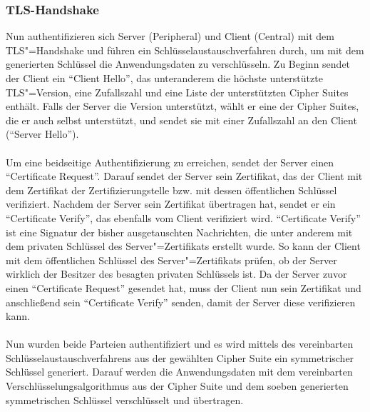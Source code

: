 \subsubsection{TLS-Handshake}
Nun authentifizieren sich Server (Peripheral) und Client (Central) mit dem TLS"=Handshake und führen ein Schlüsselaustauschverfahren durch, um mit dem generierten Schlüssel die Anwendungsdaten zu verschlüsseln. Zu Beginn sendet der Client ein "`Client Hello"', das unteranderem die höchste unterstützte TLS"=Version, eine Zufallszahl und eine Liste der unterstützten Cipher Suites enthält. Falls der Server die Version unterstützt, wählt er eine der Cipher Suites, die er auch selbst unterstützt, und sendet sie mit einer Zufallszahl an den Client ("`Server Hello"').
\\\\
Um eine beidseitige Authentifizierung zu erreichen, sendet der Server einen "`Certificate Request"'. Darauf sendet der Server sein Zertifikat, das der Client mit dem Zertifikat der Zertifizierungstelle bzw. mit dessen öffentlichen Schlüssel verifiziert. Nachdem der Server sein Zertifikat übertragen hat, sendet er ein "`Certificate Verify"', das ebenfalls vom Client verifiziert wird. "`Certificate Verify"' ist eine Signatur der bisher ausgetauschten Nachrichten, die unter anderem mit dem privaten Schlüssel des Server"=Zertifikats erstellt wurde. So kann der Client mit dem öffentlichen Schlüssel des Server"=Zertifikats prüfen, ob der Server wirklich der Besitzer des besagten privaten Schlüssels ist. Da der Server zuvor einen "`Certificate Request"' gesendet hat, muss der Client nun sein Zertifikat und anschließend sein "`Certificate Verify"' senden, damit der Server diese verifizieren kann.
\\\\
Nun wurden beide Parteien authentifiziert und es wird mittels des vereinbarten Schlüsselaustauschverfahrens aus der gewählten Cipher Suite ein symmetrischer Schlüssel generiert. Darauf werden die Anwendungsdaten mit dem vereinbarten Verschlüsselungsalgorithmus aus der Cipher Suite und dem soeben generierten symmetrischen Schlüssel verschlüsselt und übertragen.